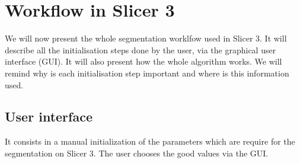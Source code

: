 \section{Workflow in Slicer 3}
We will now present the whole segmentation worklfow used in Slicer 3. It will describe all the initialisation steps done by the user, via the graphical user interface (GUI). It will also present how the whole algorithm works. We will remind why is each initialisation step important and where is this information used.
%
\subsection{User interface}\label{GUI}
It consists in a manual initialization of the parameters which are require for the segmentation on Slicer 3. The user chooses the good values via the GUI.

